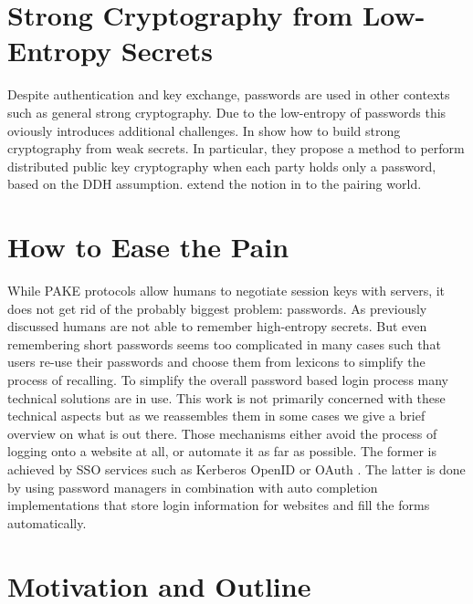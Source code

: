 \section{Strong Cryptography from Low-Entropy Secrets}
Despite authentication and key exchange, passwords are used in other contexts such as general strong cryptography.
Due to the low-entropy of passwords this oviously introduces additional challenges.
In \cite{AbdallaBCP09} \citeauthor{AbdallaBCP09} show how to build strong cryptography from weak secrets.
In particular, they propose a method to perform distributed public key cryptography when each party holds only a password, based on the \acl{DDH} assumption.
\citeauthor{BoyenCFP10} extend the notion in \cite{BoyenCFP10} to the pairing world.


\section{How to Ease the Pain}
While \acl{PAKE} protocols allow humans to negotiate session keys with servers, it does not get rid of the probably biggest problem: passwords.
As previously discussed humans are not able to remember high-entropy secrets.
But even remembering short passwords seems too complicated in many cases such that users re-use their passwords and choose them from lexicons to simplify the process of recalling.
To simplify the overall password based login process many technical solutions are in use.
This work is not primarily concerned with these technical aspects but as we reassembles them in some cases we give a brief overview on what is out there.
Those mechanisms either avoid the process of logging onto a website at all, or automate it as far as possible.
The former is achieved by \ac{SSO} services such as Kerberos \cite{rfc4120} OpenID \cite{OpenID} or OAuth \cite{rfc6749}.
The latter is done by using password managers in combination with auto completion implementations that store login information for websites and fill the forms automatically.


\section{Motivation and Outline}

